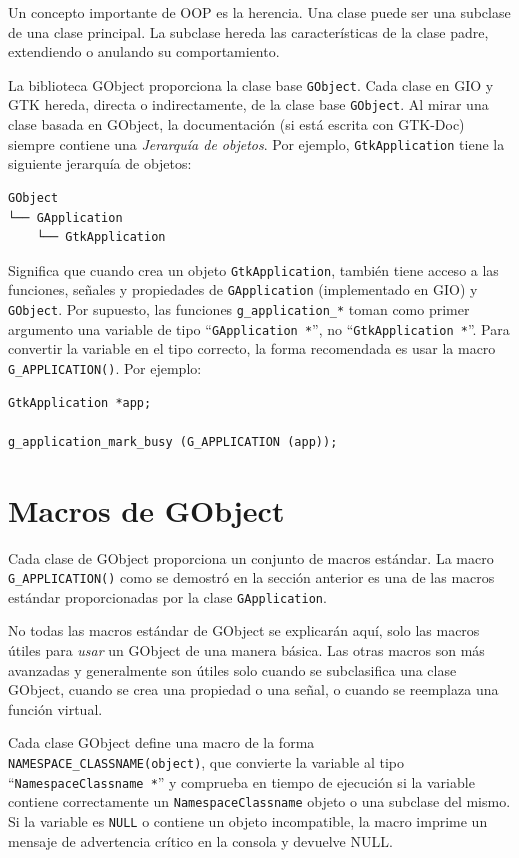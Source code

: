 Un concepto importante de OOP es la herencia. Una clase puede ser una subclase de una clase principal. La subclase hereda las características de la clase padre, extendiendo o anulando su comportamiento.

La biblioteca GObject proporciona la clase base \lstinline{GObject}. Cada clase en GIO y GTK hereda, directa o indirectamente, de la clase base \lstinline{GObject}. Al mirar una clase basada en GObject, la documentación (si está escrita con GTK-Doc) siempre contiene una \emph{Jerarquía de objetos}. Por ejemplo, \lstinline{GtkApplication} tiene la siguiente jerarquía de objetos:

\begin{verbatim}
GObject
└── GApplication
    └── GtkApplication
\end{verbatim}

Significa que cuando crea un objeto \lstinline{GtkApplication}, también tiene acceso a las funciones, señales y propiedades de \lstinline{GApplication} (implementado en GIO) y \lstinline{GObject}. Por supuesto, las funciones \lstinline{g_application_*} toman como primer argumento una variable de tipo ``\lstinline{GApplication *}'', no ``\lstinline{GtkApplication *}''. Para convertir la variable en el tipo correcto, la forma recomendada es usar la macro \lstinline{G_APPLICATION()}. Por ejemplo:

\begin{lstlisting}
GtkApplication *app;

g_application_mark_busy (G_APPLICATION (app));
\end{lstlisting}

\section{Macros de GObject}

Cada clase de GObject proporciona un conjunto de macros estándar. La macro \lstinline{G_APPLICATION()} como se demostró en la sección anterior es una de las macros estándar proporcionadas por la clase \lstinline{GApplication}.

No todas las macros estándar de GObject se explicarán aquí, solo las macros útiles para \emph{usar} un GObject de una manera básica. Las otras macros son más avanzadas y generalmente son útiles solo cuando se subclasifica una clase GObject, cuando se crea una propiedad o una señal, o cuando se reemplaza una función virtual.

Cada clase GObject define una macro de la forma \lstinline{NAMESPACE_CLASSNAME(object)}, que convierte la variable al tipo ``\lstinline{NamespaceClassname *}'' y comprueba en tiempo de ejecución si la variable contiene correctamente un \lstinline{NamespaceClassname} objeto o una subclase del mismo. Si la variable es \lstinline{NULL} o contiene un objeto incompatible, la macro imprime un mensaje de advertencia crítico en la consola y devuelve NULL.

